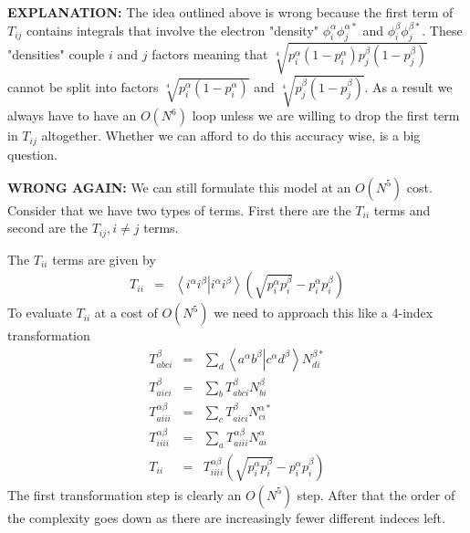 \documentclass[pra]{revtex4-1}
\newcommand{\eria}[4]{\left\langle #1^\alpha #2^\beta \right.\left| #3^\alpha #4^\beta \right\rangle}
\begin{document}
{\bf EXPLANATION:}
The idea outlined above is wrong because the first term of $T_{ij}$ contains integrals
that involve the electron "density" $\phi_i^\alpha\phi_j^{\alpha*}$ and 
$\phi_i^\beta\phi_j^{\beta*}$. These "densities" couple $i$ and $j$ factors meaning that
$\sqrt[4]{p_i^\alpha(1-p_i^\alpha)p_j^\beta(1-p_j^\beta)}$ cannot be split into 
factors $\sqrt[4]{p_i^\alpha(1-p_i^\alpha)}$ and $\sqrt[4]{p_j^\beta(1-p_j^\beta)}$.
As a result we always have to have an $O(N^6)$ loop unless we are willing to drop
the first term in $T_{ij}$ altogether. Whether we can afford to do this accuracy wise, is 
a big question.

{\bf WRONG AGAIN:}
We can still formulate this model at an $O(N^5)$ cost. Consider that we have two
types of terms. First there are the $T_{ii}$ terms and second are the $T_{ij}, i \ne j$
terms.

The $T_{ii}$ terms are given by 
\begin{eqnarray}
  T_{ii} &=& \eria{i}{i}{i}{i}\left(\sqrt{p_i^\alpha p_i^\beta}-p_i^\alpha p_i^\beta\right) 
\end{eqnarray}
To evaluate $T_{ii}$ at a cost of $O(N^5)$ we need to approach this like a 4-index 
transformation
\begin{eqnarray}
  T_{abci}^\beta         &=& \sum_d \eria{a}{b}{c}{d}N_{di}^{\beta *} \\
  T_{aici}^\beta         &=& \sum_b T_{abci}^\beta N_{bi}^{\beta} \\
  T_{aiii}^{\alpha\beta} &=& \sum_c T_{aici}^\beta N_{ci}^{\alpha *} \\
  T_{iiii}^{\alpha\beta} &=& \sum_a T_{aiii}^{\alpha\beta} N_{ai}^{\alpha} \\
  T_{ii}                 &=& T_{iiii}^{\alpha\beta}
                             \left(\sqrt{p_i^\alpha p_i^\beta}-p_i^\alpha p_i^\beta\right) 
\end{eqnarray}
The first transformation step is clearly an $O(N^5)$ step. After that the order of the
complexity goes down as there are increasingly fewer different indeces left.
\end{document}
